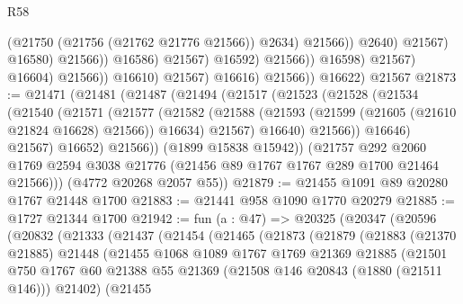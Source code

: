 \begin{lexlean}{R58}
\begin{coremodule}
                                                  (@21750 (@21756 (@21762 @21776 @21566)) @2634)
                                                  @21566))
                                              @2640)
                                            @21567)
                                          @16580)
                                        @21566))
                                    @16586)
                                  @21567)
                                @16592)
                              @21566))
                          @16598)
                        @21567)
                      @16604)
                    @21566))
                @16610)
              @21567)
            @16616)
          @21566))
      @16622)
    @21567
@21873 := @21471
    (@21481
      (@21487
        (@21494
          (@21517
            (@21523
              (@21528
                (@21534
                  (@21540
                    (@21571
                      (@21577
                        (@21582
                          (@21588
                            (@21593 (@21599 (@21605 (@21610 @21824 @16628) @21566)) @16634)
                            @21567)
                          @16640)
                        @21566))
                    @16646)
                  @21567)
                @16652)
              @21566))
          (@1899 @15838 @15942))
        (@21757
          @292
          @2060
          @1769
          @2594
          @3038
          @21776
          (@21456 @89 @1767 @1767 @289 @1700 @21464 @21566)))
      (@4772 @20268 @2057 @55))
@21879 := @21455 @1091 @89 @20280 @1767 @21448 @1700
@21883 := @21441 @958 @1090 @1770 @20279
@21885 := @1727 @21344 @1700
@21942 := fun (a : @47) =>
  @20325
    (@20347
      (@20596
        (@20832
          (@21333
            (@21437
              (@21454
                (@21465
                  (@21873
                    (@21879
                      (@21883
                        (@21370 @21885)
                        @21448
                        (@21455
                          @1068
                          @1089
                          @1767
                          @1769
                          @21369
                          @21885
                          (@21501
                            @750
                            @1767
                            @60
                            @21388
                            @55
                            @21369
                            (@21508 @146 @20843 (@1880 (@21511 @146)))
                            @21402)
                          (@21455

\end{coremodule}
\end{lexlean}
